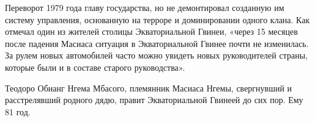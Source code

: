 Переворот 1979 года  главу государства, но не демонтировал созданную им систему управления, основанную на терроре и доминировании одного клана. Как отмечал один из жителей столицы Экваториальной Гвинеи, «через 15 месяцев после падения Масиаса ситуация в Экваториальной Гвинее почти не изменилась. За рулем новых автомобилей часто можно увидеть новых руководителей страны, которые были и в составе старого руководства».

\begin{fancyquotes}
    Теодоро Обианг Нгема Мбасого, племянник Масиаса Нгемы, свергнувший и расстрелявший родного дядю, правит Экваториальной Гвинеей до сих пор. Ему 81 год.
\end{fancyquotes}
